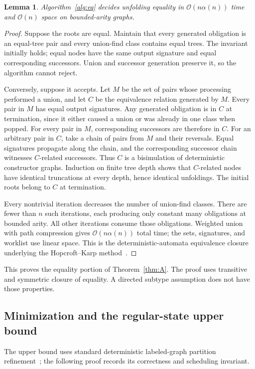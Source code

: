 \documentclass[11pt,letterpaper]{article}
\newtheorem{lemma}[theorem]{Lemma}
\theoremstyle{definition}\newtheorem{definition}[theorem]{Definition}
\newcommand{\Oh}{\mathcal O}
\begin{document}
\begin{lemma}\label{lem:eq}
Algorithm~\ref{alg:eq} decides unfolding equality in $\Oh(n\alpha(n))$ time and $\Oh(n)$ space on bounded-arity graphs.
\end{lemma}
\begin{proof}
Suppose the roots are equal. Maintain that every generated obligation is an equal-tree pair and every union-find class contains equal trees. The invariant initially holds; equal nodes have the same output signature and equal corresponding successors. Union and successor generation preserve it, so the algorithm cannot reject.

Conversely, suppose it accepts. Let $M$ be the set of pairs whose processing performed a union, and let $C$ be the equivalence relation generated by $M$. Every pair in $M$ has equal output signatures. Any generated obligation is in $C$ at termination, since it either caused a union or was already in one class when popped. For every pair in $M$, corresponding successors are therefore in $C$. For an arbitrary pair in $C$, take a chain of pairs from $M$ and their reversals. Equal signatures propagate along the chain, and the corresponding successor chain witnesses $C$-related successors. Thus $C$ is a bisimulation of deterministic constructor graphs. Induction on finite tree depth shows that $C$-related nodes have identical truncations at every depth, hence identical unfoldings. The initial roots belong to $C$ at termination.

Every nontrivial iteration decreases the number of union-find classes. There are fewer than $n$ such iterations, each producing only constant many obligations at bounded arity. All other iterations consume those obligations. Weighted union with path compression gives $\Oh(n\alpha(n))$ total time; the sets, signatures, and worklist use linear space. This is the deterministic-automata equivalence closure underlying the Hopcroft--Karp method~\cite{HK71}.
\end{proof}
This proves the equality portion of Theorem~\ref{thm:A}. The proof uses transitive and symmetric closure of equality. A directed subtype assumption does not have those properties.

\subsection{Minimization and the regular-state upper bound}
The upper bound uses standard deterministic labeled-graph partition refinement~\cite{PT87}; the following proof records its correctness and scheduling invariant.
\end{document}
